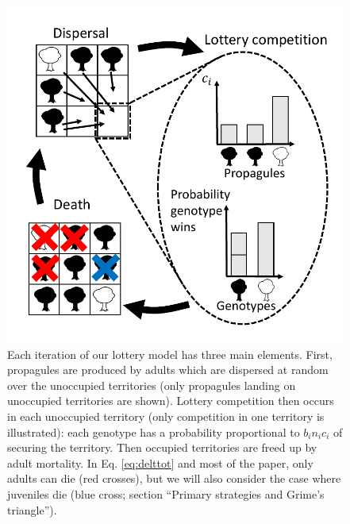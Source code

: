 \documentclass[11pt]{article}
\begin{document}
\begin{figure}
\centering
\includegraphics[scale=0.8]{lottery.pdf}
\caption{\label{fig:lottery} Each iteration of our lottery model has three main elements. First, propagules are produced by adults which are dispersed at random over the unoccupied territories (only propagules landing on unoccupied territories are shown). Lottery competition then occurs in each unoccupied territory (only competition in one territory is illustrated): each genotype has a probability proportional to $b_i n_i c_i$ of securing the territory. Then occupied territories are freed up by adult mortality. In Eq. \eqref{eq:delttot} and most of the paper, only adults can die (red crosses), but we will also consider the case where juveniles die (blue cross; section ``Primary strategies and Grime's triangle'').}
\end{figure}
\end{document}
